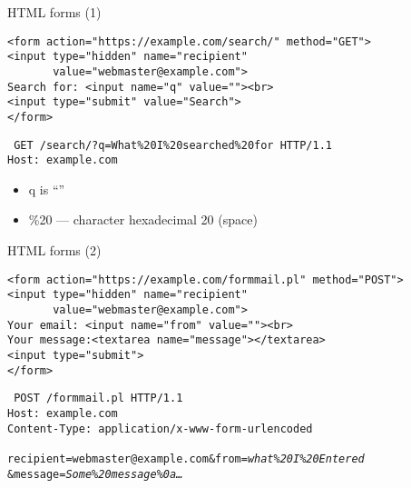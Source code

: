 
\begin{frame}[fragile,label=HTMLForms1]{HTML forms (1)}
\begin{verbatim}
<form action="https://example.com/search/" method="GET">
<input type="hidden" name="recipient"
       value="webmaster@example.com">
Search for: <input name="q" value=""><br>
<input type="submit" value="Search">
</form>
\end{verbatim}
\begin{framed}
\tt\small
GET /search/?q=What\%20I\%20searched\%20for HTTP/1.1 \\
Host: example.com
\end{framed}
    \begin{itemize}
        \item q is ``''
        \item \%20 --- character hexadecimal 20 (space)
    \end{itemize}
\end{frame}

\begin{frame}[fragile,label=HTMLForms2]{HTML forms (2)}
\begin{verbatim}
<form action="https://example.com/formmail.pl" method="POST">
<input type="hidden" name="recipient"
       value="webmaster@example.com">
Your email: <input name="from" value=""><br>
Your message:<textarea name="message"></textarea>
<input type="submit">
</form>
\end{verbatim}
\begin{framed}
\tt\small
POST /formmail.pl HTTP/1.1 \\
Host: example.com \\
Content-Type: application/x-www-form-urlencoded \\
~ \\
recipient=webmaster@example.com\&from=\textit{what\%20I\%20Entered}\\\&message=\textit{Some\%20message\%0a\ldots} \\
\end{framed}
\end{frame}

